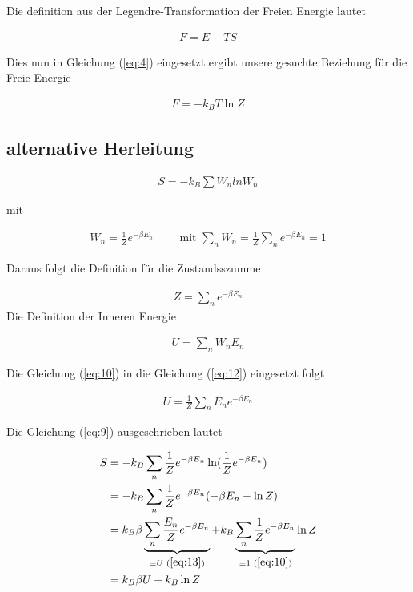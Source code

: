 Die definition aus der Legendre-Transformation der Freien Energie lautet

\begin{align}
  \label{eq:5}
  F = E - TS
\end{align}

Dies nun in Gleichung (\ref{eq:4}) eingesetzt ergibt unsere gesuchte Beziehung für die Freie Energie

\begin{align}
  \label{eq:6}
\boxed{  F =  - k_B T \ln Z }
\end{align}


\subsection{alternative Herleitung}



\begin{align}
  \label{eq:9}
  S = - k_B\sum W_n ln W_n
\end{align}

mit

\begin{align}
  \label{eq:10}
  W_n = \frac{1}{Z}e^{-\beta E_n}\qquad \text{ mit } \sum_n W_n = \frac{1}{Z}\sum_ne^{-\beta E_n} = 1
\end{align}

Daraus folgt die Definition für die Zustandsszumme

\begin{align}
  \label{eq:11}
  Z = \sum_n e^{-\beta E_n}
\end{align}
Die Definition der Inneren Energie

\begin{align}
  \label{eq:12}
  U = \sum_n W_n E_n
\end{align}

Die Gleichung (\ref{eq:10}) in die Gleichung (\ref{eq:12}) eingesetzt folgt

\begin{align}
  \label{eq:13}
  U = \frac{1}{Z}\sum_n E_ne^{-\beta E_n}
\end{align}

Die Gleichung (\ref{eq:9}) ausgeschrieben lautet

\begin{align}
  \label{eq:15}
  S &= -k_B \sum_n \frac{1}{Z}e^{-\beta E_n} \ln(\frac{1}{Z}e^{-\beta E_n}) \notag\\
&= -k_B \sum_n \frac{1}{Z}e^{-\beta E_n} (-\beta E_n - \ln Z ) \notag\\
&= k_B \beta \underbr{\sum_n \frac{E_n}{Z}e^{-\beta E_n}}_{\equiv U\,\, (\ref{eq:13})} + k_B \underbr{\sum_n \frac{1}{Z}e^{-\beta E_n}}_{\equiv 1\,\, (\ref{eq:10})} \ln Z  \notag\\
&= k_B \beta U + k_B \ln Z
\end{align}

